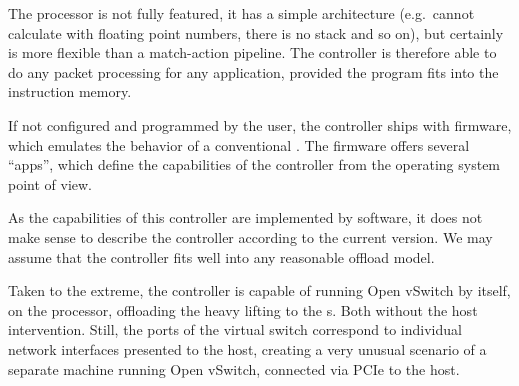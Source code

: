 The processor is not fully featured, it has a simple architecture (e.g.\ cannot
calculate with floating point numbers, there is no stack and so on), but
certainly is more flexible than a match-action pipeline. The controller is
therefore able to do any packet processing for any application, provided the
program fits into the instruction memory.

If not configured and programmed by the user, the controller ships with
firmware, which emulates the behavior of a conventional . The firmware
offers several ``apps'', which define the capabilities of the controller from
the operating system point of view.

As the capabilities of this controller are implemented by software, it does not
make sense to describe the controller according to the current version. We may
assume that the controller fits well into any reasonable offload model.

Taken to the extreme, the controller is capable of running Open vSwitch by
itself, on the  processor, offloading the heavy lifting to the s.
Both without the host intervention. Still, the ports of the virtual switch
correspond to individual network interfaces presented to the host, creating
a very unusual scenario of a separate machine running Open vSwitch, connected
via PCIe to the host.

